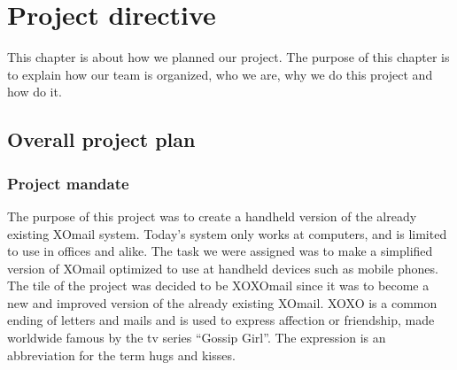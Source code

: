 \chapter{Project directive}

This chapter is about how we planned our project. The purpose of this chapter is to explain how our team is organized, who we are, why we do this project and how do it.

\section{Overall project plan}

\subsection{Project mandate}
The purpose of this project was to create a handheld version of the already existing XOmail system. Today’s system only works at computers, and is limited to use in offices and alike. The task we were assigned was to make a simplified version of XOmail optimized to use at handheld devices such as mobile phones.
\newline
\newline
The tile of the project was decided to be XOXOmail since it was to become a new and improved version of the already existing XOmail. XOXO is a common ending of letters and mails and is used to express affection or friendship, made worldwide famous by the tv series “Gossip Girl”. The expression is an abbreviation for the term hugs and kisses.

